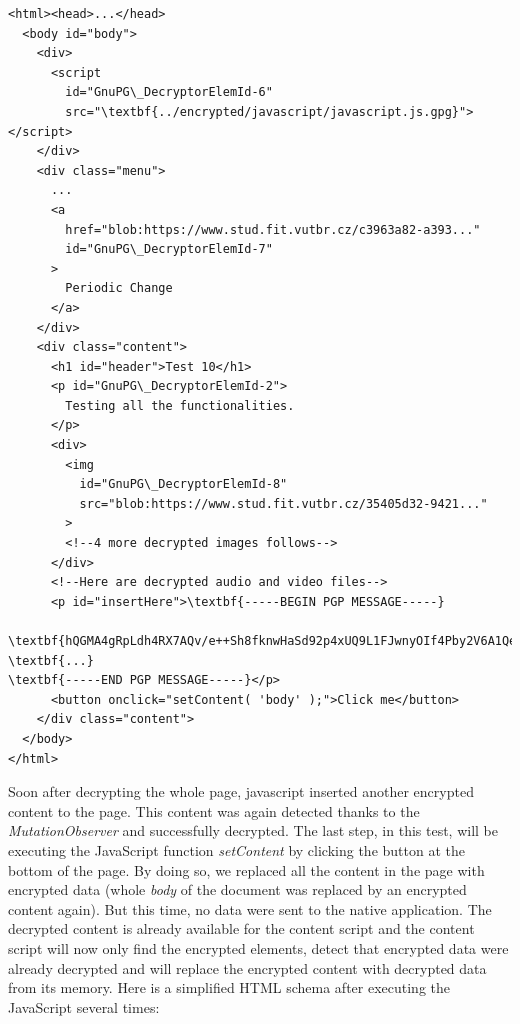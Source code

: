 \begin{Verbatim}[commandchars=\\\{\},codes={\catcode`$=3\catcode`_=8},samepage=false,frame=single]
<html><head>...</head>
  <body id="body">
    <div>
      <script
        id="GnuPG\_DecryptorElemId-6"
        src="\textbf{../encrypted/javascript/javascript.js.gpg}"></script>
    </div>
    <div class="menu">
      ...
      <a
        href="blob:https://www.stud.fit.vutbr.cz/c3963a82-a393..."
        id="GnuPG\_DecryptorElemId-7"
      >
        Periodic Change
      </a>
    </div>
    <div class="content">
      <h1 id="header">Test 10</h1>
      <p id="GnuPG\_DecryptorElemId-2">
        Testing all the functionalities.
      </p>
      <div>
        <img
          id="GnuPG\_DecryptorElemId-8"
          src="blob:https://www.stud.fit.vutbr.cz/35405d32-9421..."
        >
        <!--4 more decrypted images follows-->
      </div>
      <!--Here are decrypted audio and video files-->
      <p id="insertHere">\textbf{-----BEGIN PGP MESSAGE-----}

\textbf{hQGMA4gRpLdh4RX7AQv/e++Sh8fknwHaSd92p4xUQ9L1FJwnyOIf4Pby2V6A1Qe7}
\textbf{...}
\textbf{-----END PGP MESSAGE-----}</p>
      <button onclick="setContent( 'body' );">Click me</button>
    </div class="content">
  </body>
</html>
\end{Verbatim}

Soon after decrypting the whole page, javascript inserted another encrypted content to the page. This content was again detected thanks to the \textit{MutationObserver} and successfully decrypted. The last step, in this test, will be executing the JavaScript function \textit{setContent} by clicking the button at the bottom of the page. By doing so, we replaced all the content in the page with encrypted data (whole \textit{body} of the document was replaced by an encrypted content again). But this time, no data were sent to the native application. The decrypted content is already available for the content script and the content script will now only find the encrypted elements, detect that encrypted data were already decrypted and will replace the encrypted content with decrypted data from its memory. Here is a simplified HTML schema after executing the JavaScript several times:

